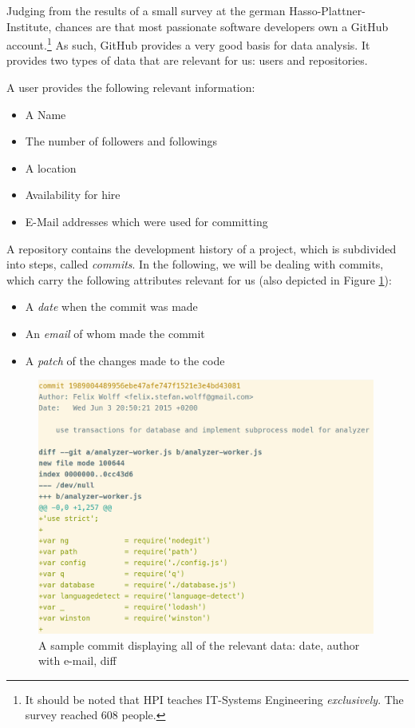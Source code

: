 
Judging from the results of a small survey at the german Hasso-Plattner-Institute,
chances are that most passionate software developers own a GitHub account.\footnote{It should be
noted that HPI teaches IT-Systems Engineering \textit{exclusively}. The
survey reached 608 people.}
As such, GitHub provides a very good basis for data analysis.
It provides two types of data that are relevant for us: users and repositories.
\newline

A user provides the following relevant information:
\begin{itemize}
  \item A Name
  \item The number of followers and followings
  \item A location
  \item Availability for hire
  \item E-Mail addresses which were used for committing
\end{itemize}
\vspace{2em}

\noindent A repository contains the development history of a project, which is subdivided into steps,
called \textit{commits}. In the following, we will be dealing with commits,
which carry the following attributes relevant for us (also depicted in Figure \ref{fig:commit}):

\begin{itemize}
    \item A \textit{date} when the commit was made
    \item An \textit{email} of whom made the commit
    \item A \textit{patch} of the changes made to the code
\end{itemize}

\begin{figure}
    \includegraphics[width=30em]{gfx/commit.png}
    \caption{A sample commit displaying all of the relevant data: date, author with e-mail, diff}
    \label{fig:commit}
\end{figure}


